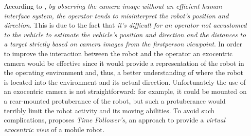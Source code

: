 %
According to \cite{sugimoto}, \textit{by observing the camera image 
without an efficient human interface system, the operator 
tends to misinterpret the robot's position and direction}. This is 
due to the fact that  \textit{it's difficult for an
operator not accustomed to the vehicle to estimate the
vehicle's position and direction and the distances to a
target strictly based on camera images from the firstperson 
viewpoint}.
%
In order to improve the interaction between the robot and the operator 
an exocentric camera would be effective since it would provide a 
representation of the robot in the operating environment and, thus, 
a better understanding of where the robot is located into the environment 
and its actual direction.
%
Unfortunately the use of an exocentric camera is not straightforward: 
for example, it could be mounted on a rear-mounted protuberance of the 
robot, but such a protuberance would terribly limit the robot activity and 
its moving abilities.
%
To avoid such complications, \cite{sugimoto} proposes 
\textit{Time Follower's}, an approach to provide a \textit{virtual exocentric 
view} of a mobile robot.
%

